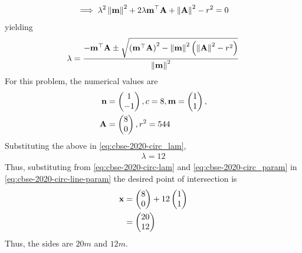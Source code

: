 \documentclass[journal,12pt,twocolumn]{IEEEtran}
\begin{document}
\begin{enumerate}
\begin{multline}
			    \implies \lambda^2\left\lVert\mathbf{m}\right\rVert^2+ 2 \lambda \mathbf{m}^{\top}\mathbf{A}
			    +\left\lVert\mathbf{A}\right\rVert^2 - r^2 = 0
		    \end{multline}
		    yielding 
		    {\small
		    \begin{align}
			    \label{eq:cbse-2020-circ_lam}
		\lambda = \frac{-\mathbf{m}^{\top}\mathbf{A}\pm \sqrt{\left(\mathbf{m}^{\top}\mathbf{A}\right)^2 -\left\lVert\mathbf{m}\right\rVert^2\left(\left\lVert\mathbf{A}\right\rVert^2 - r^2 \right)}}{\left\lVert\mathbf{m}\right\rVert^2}
		    \end{align}
		    }
		    For this problem, the numerical values are
		    \begin{align}
			    \label{eq:cbse-2020-circ_param}
			    \mathbf{n} &= \begin{pmatrix}1 \\ -1\end{pmatrix}, c = 8, 
		\mathbf{m} = \begin{pmatrix}1 \\ 1\end{pmatrix}, 
			    \\
			     \mathbf{A} &= \begin{pmatrix}8 \\ 0\end{pmatrix},  r^2 = 544
		    \end{align}
		    Substituting the above in 
			    \eqref{eq:cbse-2020-circ_lam}, 
		    \begin{align}
			    \lambda = 12
			    \label{eq:cbse-2020-circ-lam}
		    \end{align}
		    Thus, substituting from 
			    \eqref{eq:cbse-2020-circ-lam}
			    and 
			    \eqref{eq:cbse-2020-circ_param}
			    in 
			    \eqref{eq:cbse-2020-circ-line-param}
			    the desired point of intersection is 
		    \begin{align}
			    \mathbf{x} &= \begin{pmatrix}8 \\ 0\end{pmatrix} +  12 \begin{pmatrix}1 \\ 1\end{pmatrix}
			    \\
			    &= \begin{pmatrix}20 \\ 12\end{pmatrix}
		    \end{align}
		    Thus, the sides are $20m$ and $12m$.


\end{enumerate}
\end{document}
